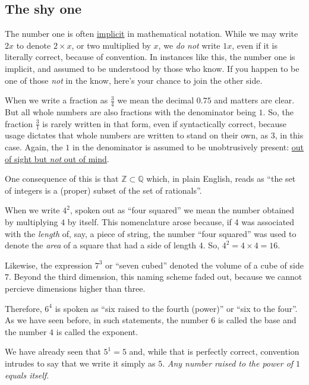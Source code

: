 \documentclass[
  a4paper,
]{article}
\begin{document}
\subsection{The shy one}\label{the-shy-one}

The number one is often
\href{https://www.vocabulary.com/dictionary/implicit}{implicit} in
mathematical notation. While we may write \(2x\) to denote
\(2\times x\), or two multiplied by \(x\), we \emph{do not} write
\(1x\), even if it is literally correct, because of convention. In
instances like this, the number one is implicit, and assumed to be
understood by those who know. If you happen to be one of those
\emph{not} in the know, here's your chance to join the other side.

When we write a fraction as \(\frac{3}{4}\) we mean the decimal \(0.75\)
and matters are clear. But all whole numbers are also fractions with the
denominator being \(1\). So, the fraction \(\frac{3}{1}\) is rarely
written in that form, even if syntactically correct, because usage
dictates that whole numbers are written to stand on their own, as \(3\),
in this case. Again, the \(1\) in the denominator is assumed to be
unobtrusively present:
\href{https://dictionary.cambridge.org/dictionary/english/out-of-sight-out-of-mind}{out
of sight but \emph{not} out of mind}.

One consequence of this is that \(\mathbb{Z} \subset \mathbb{Q}\) which,
in plain English, reads as ``the set of integers is a (proper) subset of
the set of rationals''.

When we write \(4^2\), spoken out as ``four squared'' we mean the number
obtained by multiplying \(4\) by itself. This nomenclature arose
because, if 4 was associated with the \emph{length} of, say, a piece of
string, the number ``four squared'' was used to denote the \emph{area}
of a square that had a side of length \(4\). So,
\(4^2 = 4\times4 = 16\).

Likewise, the expression \(7^3\) or ``seven cubed'' denoted the volume
of a cube of side \(7\). Beyond the third dimension, this naming scheme
faded out, because we cannot percieve dimensions higher than three.

Therefore, \(6^4\) is spoken as ``six raised to the fourth (power)'' or
``six to the four''. As we have seen before, in such statements, the
number \(6\) is called the base and the number \(4\) is called the
exponent.

We have already seen that \(5^1 = 5\) and, while that is perfectly
correct, convention intrudes to say that we write it simply as \(5\).
\emph{Any number raised to the power of \(1\) equals itself}.
\end{document}
